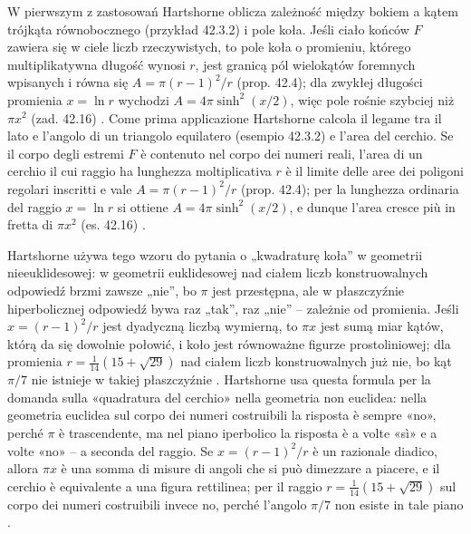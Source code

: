 W pierwszym z zastosowań Hartshorne oblicza zależność między bokiem a kątem trójkąta równobocznego (przykład 42.3.2) i pole koła. %
Jeśli ciało końców $F$ zawiera się w ciele liczb rzeczywistych, to pole koła o promieniu, którego multiplikatywna długość wynosi $r$, jest granicą pól wielokątów foremnych wpisanych i równa się $A = \pi(r-1)^2/r$ \cite[s. 407--409]{hartshorne_2000} (prop. 42.4); dla zwykłej długości promienia $x = \ln r$ wychodzi $A = 4\pi\sinh^2(x/2)$, więc pole rośnie szybciej niż $\pi x^2$ (zad. 42.16) \cite[s. 413]{hartshorne_2000}. %
Come prima applicazione Hartshorne calcola il legame tra il lato e l'angolo di un triangolo equilatero (esempio 42.3.2) e l'area del cerchio. %
Se il corpo degli estremi $F$ è contenuto nel corpo dei numeri reali, l'area di un cerchio il cui raggio ha lunghezza moltiplicativa $r$ è il limite delle aree dei poligoni regolari inscritti e vale $A = \pi(r-1)^2/r$ \cite[p. 407--409]{hartshorne_2000} (prop. 42.4); per la lunghezza ordinaria del raggio $x = \ln r$ si ottiene $A = 4\pi\sinh^2(x/2)$, e dunque l'area cresce più in fretta di $\pi x^2$ (es. 42.16) \cite[p. 413]{hartshorne_2000}. %

Hartshorne \cite[s. 409]{hartshorne_2000} używa tego wzoru do pytania o „kwadraturę koła'' w geometrii nieeuklidesowej: w geometrii euklidesowej nad ciałem liczb konstruowalnych odpowiedź brzmi zawsze „nie'', bo $\pi$ jest przestępna, ale w płaszczyźnie hiperbolicznej odpowiedź bywa raz „tak'', raz „nie'' -- zależnie od promienia. %
Jeśli $x = (r-1)^2/r$ jest dyadyczną liczbą wymierną, to $\pi x$ jest sumą miar kątów, którą da się dowolnie połowić, i koło jest równoważne figurze prostoliniowej; dla promienia $r = \tfrac{1}{14}(15+\sqrt{29})$ nad ciałem liczb konstruowalnych już nie, bo kąt $\pi/7$ nie istnieje w takiej płaszczyźnie \cite[s. 409]{hartshorne_2000}. %
Hartshorne \cite[p. 409]{hartshorne_2000} usa questa formula per la domanda sulla «quadratura del cerchio» nella geometria non euclidea: nella geometria euclidea sul corpo dei numeri costruibili la risposta è sempre «no», perché $\pi$ è trascendente, ma nel piano iperbolico la risposta è a volte «sì» e a volte «no» -- a seconda del raggio. %
Se $x = (r-1)^2/r$ è un razionale diadico, allora $\pi x$ è una somma di misure di angoli che si può dimezzare a piacere, e il cerchio è equivalente a una figura rettilinea; per il raggio $r = \tfrac{1}{14}(15+\sqrt{29})$ sul corpo dei numeri costruibili invece no, perché l'angolo $\pi/7$ non esiste in tale piano \cite[p. 409]{hartshorne_2000}. %

